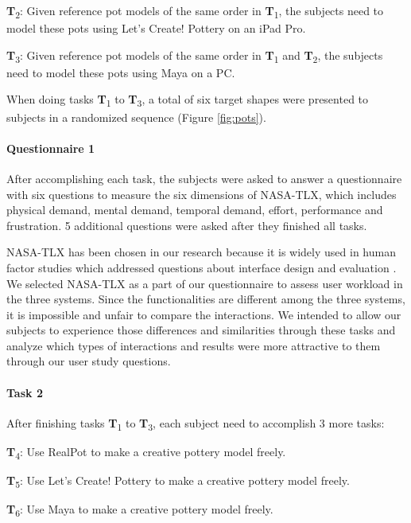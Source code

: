 \documentclass{svjour3}                     %
\begin{document}
\textbf{T}\textsubscript{2}: Given reference pot models of the same order in \textbf{T}\textsubscript{1}, the subjects need to model these pots using Let's Create! Pottery on an iPad Pro.

\textbf{T}\textsubscript{3}: Given reference pot models of the same order in \textbf{T}\textsubscript{1} and \textbf{T}\textsubscript{2}, the subjects need to model these pots using Maya on a PC.

When doing tasks \textbf{T}\textsubscript{1} to \textbf{T}\textsubscript{3}, a total of six target shapes were presented to subjects in a randomized sequence (Figure \ref{fig:pots}).

\paragraph{Questionnaire 1} After accomplishing each task, the subjects were asked to answer a questionnaire with six questions to measure the six dimensions of NASA-TLX, which includes physical demand, mental demand, temporal demand, effort, performance and frustration. 5 additional questions were asked after they finished all tasks.

NASA-TLX has been chosen in our research because it is widely used in human factor studies which addressed questions about interface design and evaluation \cite{hart2006nasa}.
We selected NASA-TLX as a part of our questionnaire to assess user workload in the three systems.
Since the functionalities are different among the three systems, it is impossible and unfair to compare the interactions.
We intended to allow our subjects to experience those differences and similarities through these tasks and analyze which types of interactions and results were more attractive to them through our user study questions.

\paragraph{Task 2} After finishing tasks \textbf{T}\textsubscript{1} to \textbf{T}\textsubscript{3}, each subject need to accomplish 3 more tasks:

\textbf{T}\textsubscript{4}: Use RealPot to make a creative pottery model freely.

\textbf{T}\textsubscript{5}: Use Let's Create! Pottery to make a creative pottery model freely.

\textbf{T}\textsubscript{6}: Use Maya to make a creative pottery model freely.
\end{document}
